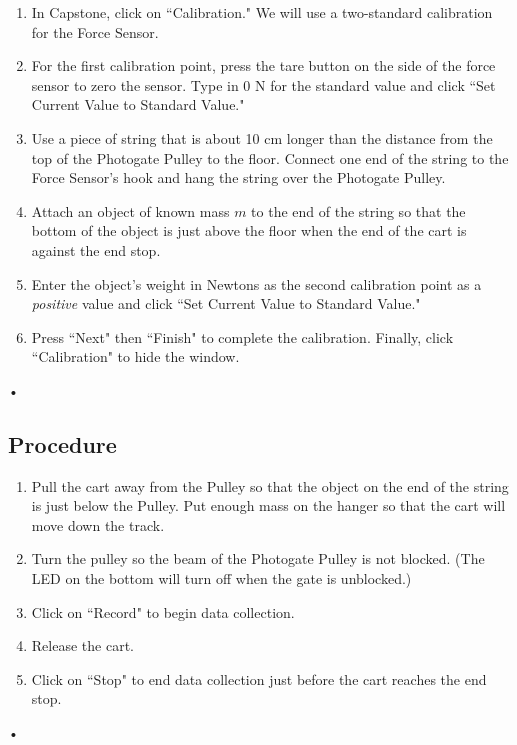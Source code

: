 \documentclass[main.tex]{subfiles}
\begin{document}
\begin{enumerate}
\item
In Capstone, click on ``Calibration." We will use a two-standard calibration for the Force Sensor.
\item
For the first calibration point, press the tare button on the side of the force sensor to zero the sensor. Type in 0 N for the standard value and click ``Set Current Value to Standard Value."
\item
Use a piece of string that is about 10 cm longer than the distance from the top of the Photogate Pulley to the floor. Connect one end of the string to the Force Sensor's hook and hang the string over the Photogate Pulley.
\item
Attach an object of known mass $m$ to the end of the string so that the bottom of the object is just above the floor when the end of the cart is against the end stop.
\item
Enter the object's weight in Newtons as the second calibration point as a \emph{positive} value and click ``Set Current Value to Standard Value."
\item
Press ``Next" then ``Finish" to complete the calibration. Finally, click ``Calibration" to hide the window.
\end{enumerate}•

\subsection*{Procedure}
\begin{enumerate}
\item
Pull the cart away from the Pulley so that the object on the end of the string is just below the Pulley. Put enough mass on the hanger so that the cart will move down the track.
\item
Turn the pulley so the beam of the Photogate Pulley is not blocked. (The LED on the bottom will turn off when the gate is unblocked.)
\item
Click on ``Record" to begin data collection.
\item
Release the cart.
\item
Click on ``Stop" to end data collection just before the cart reaches the end stop.
\end{enumerate}•
\end{document}
